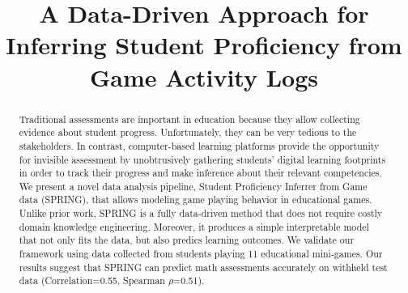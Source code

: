\documentclass{sigchi}
\def\algname{SPRING\xspace}
\def\plaintitle{A Data-Driven Approach for Inferring Student Proficiency from Game Activity Logs  }
\begin{document}
	

\title{\plaintitle}
\author
{%
  \and
}



  
\maketitle

\begin{abstract}
Traditional assessments are important in education because they allow collecting evidence about student progress. 
Unfortunately, they can be very tedious to the stakeholders.
In contrast, computer-based learning platforms provide the opportunity for invisible assessment by unobtrusively gathering students' digital learning footprints in order to track their progress and make inference about their relevant competencies.
We present a novel data analysis pipeline, {Student Proficiency Inferrer from Game data} (\algname), that allows modeling  game playing behavior in educational games.
Unlike prior work, \algname is a fully data-driven method that does not require costly domain knowledge engineering.
Moreover, it produces a simple interpretable model that not only fits the data, but also predics learning outcomes.
We validate our framework using data collected from students playing 11 educational mini-games.
Our results suggest that \algname can predict math assessments accurately on withheld test data (Correlation=0.55, Spearman $\rho$=0.51).
\end{abstract}
\end{document}
